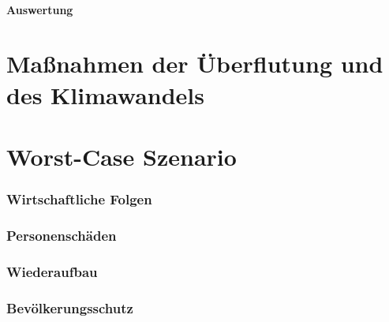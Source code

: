 \subsection{Auswertung}
 
\newpage
\part{Maßnahmen der Überflutung und des Klimawandels}


 


   

\newpage

\part{Worst-Case Szenario}
\section{Wirtschaftliche Folgen}
\newpage
\section{Personenschäden}
\newpage
\section{Wiederaufbau}
\newpage
\section{Bevölkerungsschutz}


 